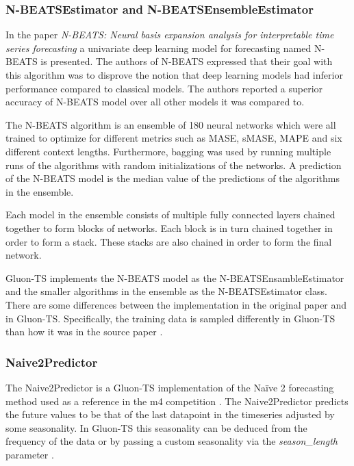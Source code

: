 \subsubsection{N-BEATSEstimator and N-BEATSEnsembleEstimator}
\label{algo:nbeats}
In the paper \textit{N-BEATS: Neural basis expansion analysis for interpretable time series forecasting} \cite{oreshkin_n_beats_2020} a univariate deep learning model for forecasting named N-BEATS is presented. The authors of N-BEATS expressed that their goal with this algorithm was to disprove the notion that deep learning models had inferior performance compared to classical models. The authors reported a superior accuracy of N-BEATS model over all other models it was compared to.

The N-BEATS algorithm is an ensemble of 180 neural networks which were all trained to optimize for different metrics such as MASE, sMASE, MAPE and six different context lengths. Furthermore, bagging was used by running multiple runs of the algorithms with random initializations of the networks. A prediction of the N-BEATS model is the median value of the predictions of the algorithms in the ensemble.

Each model in the ensemble consists of multiple fully connected layers chained together to form blocks of networks. Each block is in turn chained together in order to form a stack. These stacks are also chained in order to form the final network.

Gluon-TS implements the N-BEATS model as the N-BEATSEnsambleEstimator and the smaller algorithms in the ensemble as the N-BEATSEstimator class. There are some differences between the implementation in the original paper and in Gluon-TS. Specifically, the training data is sampled differently in Gluon-TS than how it was in the source paper \cite{gluonts-website}.

\subsubsection{Naive2Predictor}
\label{model:naive2}
The Naive2Predictor is a Gluon-TS implementation of the Naïve 2 forecasting method used as a reference in the m4 competition \cite{makridakis_m4_2020}. The Naive2Predictor predicts the future values to be that of the last datapoint in the timeseries adjusted by some seasonality. In Gluon-TS this seasonality can be deduced from the frequency of the data or by passing a custom seasonality via the \textit{season\_length} parameter \cite{gluonts-website}.

